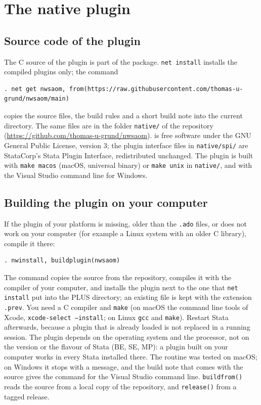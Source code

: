 \section{The native plugin}

\subsection{Source code of the plugin}

The C source of the plugin is part of the package. \texttt{net install} installs the compiled plugins only; the command
\begin{lstlisting}
. net get nwsaom, from(https://raw.githubusercontent.com/thomas-u-grund/nwsaom/main)
\end{lstlisting}
copies the source files, the build rules and a short build note into the current directory. The same files are in the folder \texttt{native/} of the repository (\url{https://github.com/thomas-u-grund/nwsaom}). \nwsaom{} is free software under the GNU General Public License, version 3; the plugin interface files in \texttt{native/spi/} are StataCorp's Stata Plugin Interface, redistributed unchanged. The plugin is built with \texttt{make macos} (macOS, universal binary) or \texttt{make unix} in \texttt{native/}, and with the Visual Studio command line for Windows.

\subsection{Building the plugin on your computer}

If the plugin of your platform is missing, older than the \texttt{.ado} files, or does not work on your computer (for example a Linux system with an older C library), compile it there:
\begin{lstlisting}
. nwinstall, buildplugin(nwsaom)
\end{lstlisting}
The command copies the source from the repository, compiles it with the compiler of your computer, and installs the plugin next to the one that \texttt{net install} put into the PLUS directory; an existing file is kept with the extension \texttt{.prev}. You need a C compiler and \texttt{make} (on macOS the command line tools of Xcode, \texttt{xcode-select --install}; on Linux \texttt{gcc} and \texttt{make}). Restart Stata afterwards, because a plugin that is already loaded is not replaced in a running session. The plugin depends on the operating system and the processor, not on the version or the flavour of Stata (BE, SE, MP): a plugin built on your computer works in every Stata installed there. The routine was tested on macOS; on Windows it stops with a message, and the build note that comes with the source gives the command for the Visual Studio command line. \texttt{buildfrom()} reads the source from a local copy of the repository, and \texttt{release()} from a tagged release.

